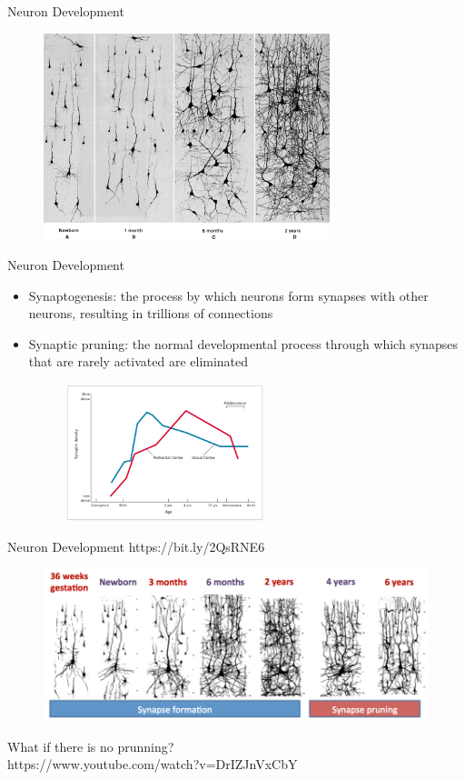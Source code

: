 \documentclass{beamer} %
\begin{document}
\begin{frame}{Neuron Development}
\begin{figure}
    \includegraphics[height=6cm, keepaspectration]{dendrites-02.jpg}
\end{figure}
\end{frame}
\begin{frame}{Neuron Development}
\begin{itemize}
    \item Synaptogenesis: the process by which neurons form synapses with other neurons, resulting in trillions of connections
    \item Synaptic pruning: the normal developmental process through which synapses that are rarely activated are eliminated
    \begin{figure}
        \includegraphics[height=4cm, keepaspectration]{sss.png}
    \end{figure}
\end{itemize}
\end{frame}
\begin{frame}{Neuron Development}
https://bit.ly/2QsRNE6
\begin{figure}
    \centering
    \includegraphics[width=\linewidth, keepaspectration]{brainscience.png}
\end{figure}
What if there is no prunning?
\\ https://www.youtube.com/watch?v=DrIZJnVxCbY
\end{frame}
\end{document}
